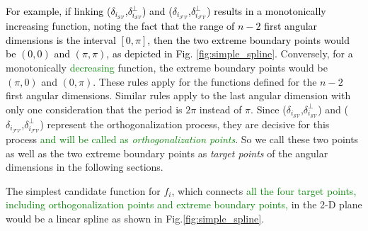 \textcolor{black}{For example, if linking ($\delta_{i_{{\mathcal{SV}}}}$,$\delta^{\perp}_{i_{{\mathcal{SV}}}}$) and ($\delta_{i_{{\mathcal{FV}}}}$,$\delta^{\perp}_{i_{{\mathcal{FV}}}}$) results in a monotonically increasing function, noting the fact that the range of $n-2$ first angular dimensions is the interval $[0, \pi]$, then the two extreme boundary points would be $(0,0)$ and $(\pi,\pi)$, as depicted in Fig. \ref{fig:simple_spline}.} Conversely, for a monotonically \textcolor{green}{decreasing} function, the extreme boundary points would be $(\pi,0)$ and $(0,\pi)$. These rules apply for the functions defined for the $n-2$ first angular dimensions. 
Similar rules apply to the last angular dimension with only one consideration that the period is $2\pi$ instead of $\pi$. Since  ($\delta_{i_{{\mathcal{SV}}}}$,$\delta^{\perp}_{i_{{\mathcal{SV}}}}$) and ($\delta_{i_{{\mathcal{FV}}}}$,$\delta^{\perp}_{i_{{\mathcal{FV}}}}$) represent the orthogonalization process, they are decisive for this process \textcolor{green}{and will be called as \textit{orthogonalization points}}. So we call these two points as well as the two extreme boundary points as \textit{target points} of the angular dimensions in the following sections. %

The simplest candidate function for $f_i$, which connects \textcolor{green}{all the four target points, including orthogonalization points and extreme boundary points,} in the 2-D plane would be a linear spline as shown in Fig.\ref{fig:simple_spline}.



